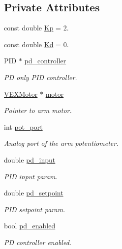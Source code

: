 \subsection*{Private Attributes}
\begin{DoxyCompactItemize}
\item 
const double \hyperlink{class_arm_ac220c9bad0a0ee0b068f11b1abf7759a}{Kp} = 2.
\item 
const double \hyperlink{class_arm_a5ba9221bf0f78fea4fb2d231551e3bb9}{Kd} = 0.
\item 
P\+ID $\ast$ \hyperlink{class_arm_a6a6a8ec7d6f383efd1672c1760a32887}{pd\+\_\+controller}
\begin{DoxyCompactList}\small\item\em PD only P\+ID controller. \end{DoxyCompactList}\item 
\hyperlink{class_v_e_x_motor}{V\+E\+X\+Motor} $\ast$ \hyperlink{class_arm_aa2ef91b2548b256c65dc92166867ba49}{motor}
\begin{DoxyCompactList}\small\item\em Pointer to arm motor. \end{DoxyCompactList}\item 
int \hyperlink{class_arm_a6e384005fe53340f168ad5708302231a}{pot\+\_\+port}
\begin{DoxyCompactList}\small\item\em Analog port of the arm potentiometer. \end{DoxyCompactList}\item 
double \hyperlink{class_arm_aa8cb716ce90ab9d02f8e4ab3735904cb}{pd\+\_\+input}
\begin{DoxyCompactList}\small\item\em P\+ID input param. \end{DoxyCompactList}\item 
double \hyperlink{class_arm_a1f4bd75360f1fa61330494569b08f4aa}{pd\+\_\+setpoint}
\begin{DoxyCompactList}\small\item\em P\+ID setpoint param. \end{DoxyCompactList}\item 
bool \hyperlink{class_arm_a44b074fd8db815261bc634f914c1e0f8}{pd\+\_\+enabled}
\begin{DoxyCompactList}\small\item\em PD controller enabled. \end{DoxyCompactList}\end{DoxyCompactItemize}


